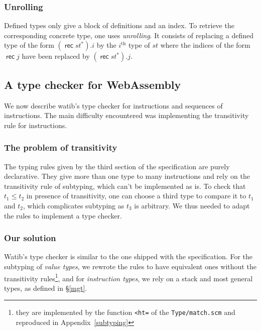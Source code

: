 \documentclass[a4paper,11pt]{article}
\DeclareMathOperator{\rect}{\textsf{rec}}
\begin{document}
\subsubsection{Unrolling}
Defined types only give a block of definitions and an index. To retrieve the
corresponding concrete type, one uses \emph{unrolling}. It consists of replacing
a defined type of the form $(\rect st^*).i$ by the $i^{\text{th}}$ type of $st$
where the indices of the form $\rect j$ have been replaced by $(\rect st^*).j$.

\subsection{A type checker for WebAssembly}\label{algo}
We now describe \textsf{watib}'s type checker for instructions and sequences of
instructions. The main difficulty encountered was implementing the transitivity
rule for instructions.
\subsubsection{The problem of transitivity}
The typing rules given by the third section of the specification are purely
declarative. They give more than one type to many instructions and rely on the
transitivity rule of subtyping, which can't be implemented as is. To check that
$t_1 \leq t_2$ in presence of transitivity, one can choose a third type to
compare it to $t_1$ and $t_2$, which complicates subtyping as $t_3$ is
arbitrary. We thus needed to adapt the rules to implement a type checker.

\subsubsection{Our solution}
\textsf{Watib}'s type checker is similar to the one shipped with the
specification. For the subtyping of \emph{value types}, we rewrote the rules to
have equivalent ones without the transitivity rules\footnote{they are
implemented by the function \texttt{<ht=} of the \texttt{Type/match.scm} and
reproduced in Appendix~\ref{subtyping}}, and for \emph{instruction types}, we
rely on a stack and most general types, as defined in \S\ref{mgt}.
\end{document}
